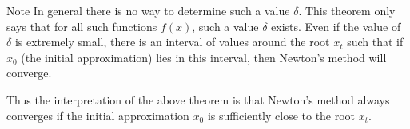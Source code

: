 \documentclass[12pt]{beamer}
\begin{document}
\begin{frame}{Note} 
In general there is no way to determine such a value $\delta$. This theorem only says that for all such functions $f(x)$, such a value $\delta$ exists. Even if the value of $\delta$ is extremely small, there is an interval of values around the root $x_t$ such that if $x_0$ (the initial approximation) lies in this interval, then Newton's method will converge. 

Thus the interpretation of the above theorem is that Newton's method always converges if the initial approximation $x_0$ is sufficiently close to the root $x_t$. 
\end{frame} 
\end{document}
